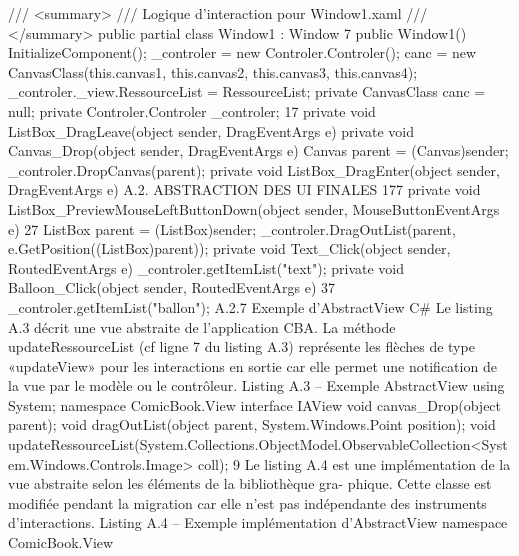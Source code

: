 \documentclass{article}
\begin{document}
{
/// <summary>
/// Logique d’interaction pour Window1.xaml
/// </summary>
public partial class Window1 : Window
7
{
public Window1()
{
InitializeComponent();
_controler = new Controler.Controler();
canc = new CanvasClass(this.canvas1, this.canvas2, this.canvas3, this.canvas4);
_controler._view.RessourceList = RessourceList;
}
private CanvasClass canc = null;
private Controler.Controler _controler;
17
private void ListBox_DragLeave(object sender, DragEventArgs e)
{ }
private void Canvas_Drop(object sender, DragEventArgs e)
{
Canvas parent = (Canvas)sender;
_controler.DropCanvas(parent);
}
private void ListBox_DragEnter(object sender, DragEventArgs e)
A.2. ABSTRACTION DES UI FINALES
177
{ }
private void ListBox_PreviewMouseLeftButtonDown(object sender, MouseButtonEventArgs e)
27
{
ListBox parent = (ListBox)sender;
_controler.DragOutList(parent, e.GetPosition((ListBox)parent));
}
private void Text_Click(object sender, RoutedEventArgs e)
{
_controler.getItemList("text");
}
private void Balloon_Click(object sender, RoutedEventArgs e)
37
{
_controler.getItemList("ballon");
}
}
}
A.2.7
Exemple d’AbstractView C#
Le listing A.3 décrit une vue abstraite de l’application CBA. La méthode updateRessourceList (cf
ligne 7 du listing A.3) représente les ﬂèches de type «updateView» pour les interactions en sortie car
elle permet une notiﬁcation de la vue par le modèle ou le contrôleur.
Listing A.3 – Exemple AbstractView
using System;
namespace ComicBook.View
{
interface IAView
{
void canvas_Drop(object parent);
void dragOutList(object parent, System.Windows.Point position);
void updateRessourceList(System.Collections.ObjectModel.ObservableCollection<System.Windows.Controls.Image> coll);
9
}
}
Le listing A.4 est une implémentation de la vue abstraite selon les éléments de la bibliothèque gra-
phique. Cette classe est modiﬁée pendant la migration car elle n’est pas indépendante des instruments
d’interactions.
Listing A.4 – Exemple implémentation d’AbstractView
namespace ComicBook.View
\end{document}
